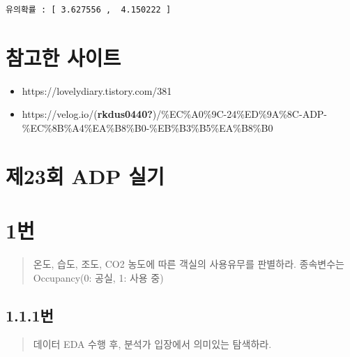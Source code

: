 \documentclass[
  letterpaper,
  DIV=11,
  numbers=noendperiod]{scrreprt}
\providecommand{\tightlist}{%
  \setlength{\itemsep}{0pt}\setlength{\parskip}{0pt}}\usepackage{longtable,booktabs,array}
\begin{document}
\begin{verbatim}
유의확률 : [ 3.627556 ,  4.150222 ]
\end{verbatim}

\hypertarget{uxcc38uxace0uxd55c-uxc0acuxc774uxd2b8-1}{%
\chapter*{참고한 사이트}\label{uxcc38uxace0uxd55c-uxc0acuxc774uxd2b8-1}}


\begin{itemize}
\tightlist
\item
  https://lovelydiary.tistory.com/381
\item
  https://velog.io/(\textbf{rkdus0440?})/\%EC\%A0\%9C-24\%ED\%9A\%8C-ADP-\%EC\%8B\%A4\%EA\%B8\%B0-\%EB\%B3\%B5\%EA\%B8\%B0
\end{itemize}

\hypertarget{uxc81c23uxd68c-adp-uxc2e4uxae30}{%
\chapter*{제23회 ADP 실기}\label{uxc81c23uxd68c-adp-uxc2e4uxae30}}


\hypertarget{uxbc88-77}{%
\chapter*{1번}\label{uxbc88-77}}


\begin{quote}
온도, 습도, 조도, CO2 농도에 따른 객실의 사용유무를 판별하라. 종속변수는
Occupancy(0: 공실, 1: 사용 중)
\end{quote}

\hypertarget{uxbc88-78}{%
\section*{1.1.1번}\label{uxbc88-78}}


\begin{quote}
데이터 EDA 수행 후, 분석가 입장에서 의미있는 탐색하라.
\end{quote}
\end{document}

